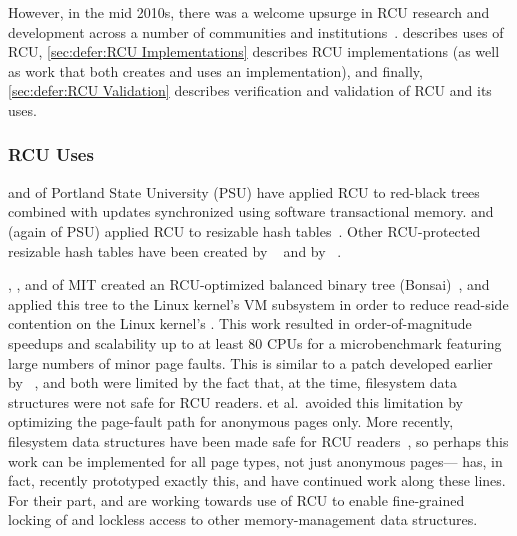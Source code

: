 However, in the mid 2010s, there was a welcome upsurge in RCU research
and development across a number of communities and
institutions~\cite{FransKaashoek2015ParallelOSHistory}.
 describes uses of RCU,
\cref{sec:defer:RCU Implementations} describes RCU implementations
(as well as work that both creates and uses an implementation),
and finally,
\cref{sec:defer:RCU Validation} describes verification and validation
of RCU and its uses.

\subsubsection{RCU Uses}
\label{sec:defer:RCU Uses}

 and  of Portland State University
(PSU) have
applied RCU to red-black
trees~\cite{PhilHowardPhD,PhilHoward2011RCUTMRBTree} combined with updates
synchronized using software transactional memory.
 and  (again of PSU)
applied RCU to resizable
hash tables~\cite{JoshTriplettPhD,Triplett:2011:RPHash,JonCorbet2014RCUhash1,JonCorbet2014RCUhash2}.
Other RCU-protected resizable hash tables have been created by
~\cite{HerbertXu2010RCUResizeHash} and by
~\cite{PaulMcKenney2013LWNURCUhash}.

, , and 
of MIT created an RCU-optimized balanced binary tree
(Bonsai)~\cite{AustinClements2012RCULinux:mmapsem}, and applied this
tree to the Linux kernel's VM subsystem in order to reduce read-side
contention on the Linux kernel's .
This work resulted in order-of-magnitude speedups and scalability up to
at least 80 CPUs for a microbenchmark featuring large numbers of minor
page faults.
This is similar to a patch developed earlier by
~\cite{PeterZijlstra2014SpeculativePageFault}, and both
were limited by the fact that, at the time, filesystem data structures
were not safe for RCU readers.
 et al.\ avoided this limitation by
optimizing the page-fault
path for anonymous pages only.
More recently, filesystem data structures have been made safe for RCU
readers~\cite{JonathanCorbet2010dcacheRCU,JonathanCorbet2011dcacheRCUbug},
so perhaps this work can be implemented for all page types, not just
anonymous pages--- has, in fact, recently prototyped
exactly this, and   have
continued work along these lines.
For their part,  and  are working
towards use of RCU to enable fine-grained locking of and lockless access
to other memory-management data structures.

